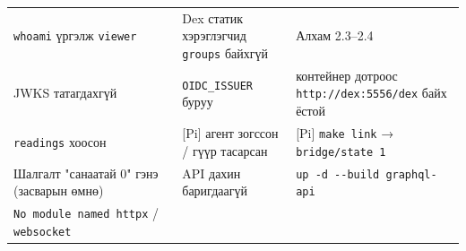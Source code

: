 \begin{longtable}[]{@{}lll@{}}
\begin{minipage}[t]{0.30\columnwidth}
\texttt{whoami} үргэлж \texttt{viewer}\strut
\end{minipage} & \begin{minipage}[t]{0.30\columnwidth}\raggedright
Dex статик хэрэглэгчид \texttt{groups} байхгүй\strut
\end{minipage} & \begin{minipage}[t]{0.30\columnwidth}\raggedright
Алхам 2.3--2.4\strut
\end{minipage}\tabularnewline
\begin{minipage}[t]{0.30\columnwidth}\raggedright
JWKS татагдахгүй\strut
\end{minipage} & \begin{minipage}[t]{0.30\columnwidth}\raggedright
\texttt{OIDC\_ISSUER} буруу\strut
\end{minipage} & \begin{minipage}[t]{0.30\columnwidth}\raggedright
контейнер дотроос \texttt{http:\allowbreak{}/\allowbreak{}/\allowbreak{}dex:\allowbreak{}5556/\allowbreak{}dex} байх ёстой\strut
\end{minipage}\tabularnewline
\begin{minipage}[t]{0.30\columnwidth}\raggedright
\texttt{readings} хоосон\strut
\end{minipage} & \begin{minipage}[t]{0.30\columnwidth}\raggedright
{[}Pi{]} агент зогссон / гүүр тасарсан\strut
\end{minipage} & \begin{minipage}[t]{0.30\columnwidth}\raggedright
{[}Pi{]} \texttt{make\ link} → \texttt{bridge/state\ 1}\strut
\end{minipage}\tabularnewline
\begin{minipage}[t]{0.30\columnwidth}\raggedright
Шалгалт "санаатай 0" гэнэ (засварын өмнө)\strut
\end{minipage} & \begin{minipage}[t]{0.30\columnwidth}\raggedright
API дахин баригдаагүй\strut
\end{minipage} & \begin{minipage}[t]{0.30\columnwidth}\raggedright
\texttt{up\ -d\ -\/\allowbreak{}-build\ graphql-api}\strut
\end{minipage}\tabularnewline
\begin{minipage}[t]{0.30\columnwidth}\raggedright
\texttt{No\ module\ named\ \textquotesingle{}httpx\textquotesingle{}} / \texttt{\textquotesingle{}websocket\textquotesingle{}}\strut
\end{minipage} & \begin{minipage}[t]{0.30\columnwidth}\raggedright

\end{minipage}
\end{longtable}
